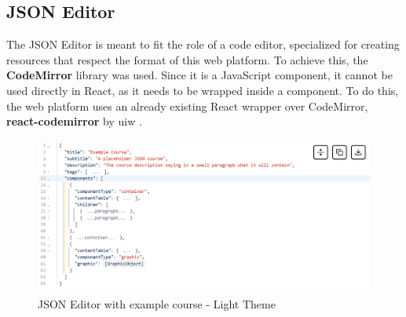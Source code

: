 \subsection{JSON Editor}

\noindent The JSON Editor is meant to fit the role of a code editor, specialized for creating resources that respect the format of this web platform. To achieve this, the \textbf{CodeMirror} library \cite{codemirror} was used. Since it is a JavaScript component, it cannot be used directly in React, as it needs to be wrapped inside a component. To do this, the web platform uses an already existing React wrapper over CodeMirror, \textbf{react-codemirror} by uiw \cite{react-codemirror}.

\begin{figure}[h]
    \centering
    \includegraphics[scale=0.63]{images/json-editor-light.png}
    \caption{JSON Editor with example course - Light Theme}
    \label{fig:json-editor-light}
\end{figure}

